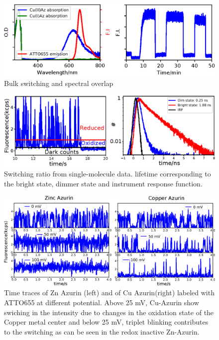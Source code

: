 \documentclass[11pt,a4paper,onecolumn]{article}
\begin{document}
\begin{figure}
  \centering
  \includegraphics{Figure_SI/spectral_overlap_switching.eps}
  \makeatletter
  \renewcommand{\fnum@figure}{\figurename~S\thefigure}
  \makeatother
  \caption{Bulk switching and spectral overlap}
  \label{SIfig: switching}
\end{figure}
\begin{figure}
  \centering
  \includegraphics{Figure_SI/lifetime.eps}
  \makeatletter
  \renewcommand{\fnum@figure}{\figurename~S\thefigure}
  \makeatother
  \caption{Switching ratio from single-molecule data. lifetime corresponding to the bright state, dimmer state and instrument response function.}
  \label{SIfig: lifetime}
\end{figure}
\begin{figure}
  \centering
  \includegraphics[width=\textwidth,keepaspectratio]{Figure_SI/SI_timetrace_Zn_Cu.eps}
	\makeatletter
	\renewcommand{\fnum@figure}{\figurename~S\thefigure}
	\makeatother
  \caption{Time traces of Zn Azurin (left) and of Cu Azurin(right) labeled with ATTO655 at different potential.  Above 25 mV, Cu-Azurin show swiching in the intensity due to changes in the oxidation state of the Copper metal center and below 25 mV, triplet blinking contributes to the switching as can be seen in the redox inactive Zn-Azurin.}
  \label{SIfig:tracecomparision}
\end{figure}
\end{document}
